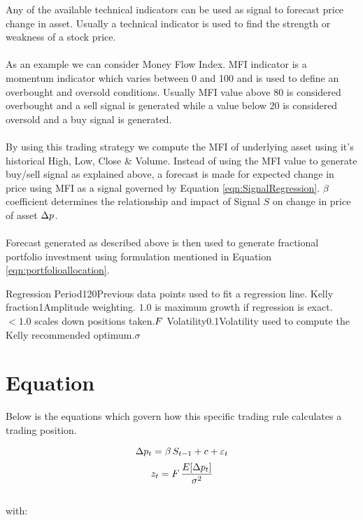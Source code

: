 \documentclass{article}
\begin{document}
\logo
{} %
\tblofcontents


\howtotrade
{Any of the available technical indicators can be used as signal to forecast price change in asset. Usually a technical indicator is used to find the strength or weakness of a stock price. \\ \\ As an example we can consider Money Flow Index. MFI indicator is a momentum indicator which varies between 0 and 100 and is used to define an overbought and oversold conditions. Usually MFI value above 80 is considered overbought and a sell signal is generated while a value below 20 is considered oversold and a buy signal is generated.\\ \\
By using this trading strategy we compute the MFI of underlying asset using it's historical High, Low, Close \& Volume. Instead of using the MFI value to generate buy/sell signal as explained above, a forecast is made for expected change in price using MFI as a signal governed by Equation \ref{eqn:SignalRegression}. $\beta$ coefficient determines the relationship and impact of Signal $S$ on change in price of asset $\Delta p$.\\ \\
Forecast generated as described above is then used to generate fractional portfolio investment using formulation mentioned in Equation \ref{eqn:portfolioallocation}.
}

{Regression Period}{120}{Previous data points used to fit a regression line.}{\lookbacklength}
{Kelly fraction}{1}{Amplitude weighting. $1.0$ is maximum growth if regression is exact.
$<1.0$ scales down positions taken.}{$F$}
{Volatility}{0.1}{Volatility used to compute the Kelly recommended optimum.}{$\sigma$}
\stoptable %

\section{Equation}
Below is the equations which govern how this specific trading rule calculates a trading position.

\begin{equation}
\label{eqn:SignalRegression}
\Delta p_{t} = \beta \, S_{t-1} + c + \varepsilon_{t}
\end{equation}
\begin{equation}
\label{eqn:portfolioallocation}
    z_{t} = F \, \frac{E[\Delta p_{t}]}{\sigma^{2}}
\end{equation}
\\
with:
\end{document}
